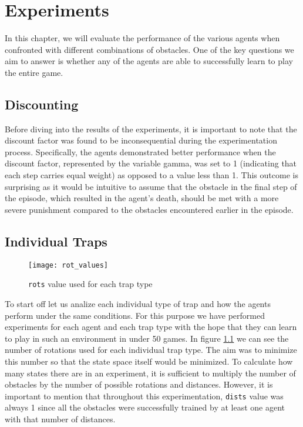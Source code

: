\chapter{Experiments}
\label{experiments_chapter}
In this chapter, we will evaluate the performance of the various agents when confronted with different combinations of obstacles. One of the key questions we aim to answer is whether any of the agents are able to successfully learn to play the entire game.

\section{Discounting}
Before diving into the results of the experiments, it is important to note that the discount factor was found to be inconsequential during the experimentation process. Specifically, the agents demonstrated better performance when the discount factor, represented by the variable gamma, was set to 1 (indicating that each step carries equal weight) as opposed to a value less than 1. This outcome is surprising as it would be intuitive to assume that the obstacle in the final step of the episode, which resulted in the agent's death, should be met with a more severe punishment compared to the obstacles encountered earlier in the episode.

\section{Individual Traps}
\begin{figure}[h]
    \centering
    \texttt{[image: rot\_values]}
    \caption{\texttt{rots} value used for each trap type}
    \label{fig:rot_values}
\end{figure}

To start off let us analize each individual type of trap and how the agents perform under the same conditions. For this purpose we have performed experiments for each agent and each trap type with the hope that they can learn to play in such an environment in under 50 games.  In figure \ref{fig:rot_values} we can see the number of rotations used for each individual trap type. The aim was to minimize this number so that the state space itself would be minimized. To calculate how many states there are in an experiment, it is sufficient  to multiply the number of obstacles by the number of possible rotations and distances. However, it is important to mention that throughout this experimentation, \texttt{dists} value was always 1 since all the obstacles were successfully trained by at least one agent with that number of distances.

